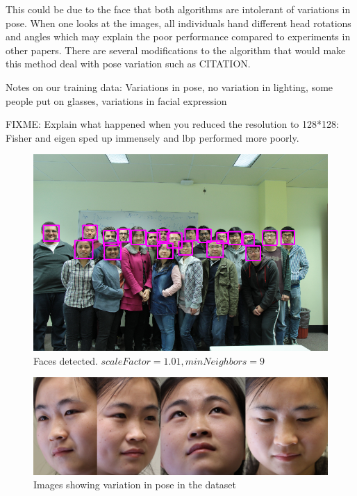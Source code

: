 \documentclass{article}
\begin{document}
This could be due to the face that both algorithms are intolerant of variations in pose. When one looks at the images, all individuals hand different head rotations and angles which may explain the poor performance compared to experiments in other papers\cite{belhumeur1997eigenfaces}. There are several modifications to the algorithm that would make this method deal with pose variation such as CITATION.

Notes on our training data: Variations in pose, no variation in lighting, some people put on glasses, variations in facial expression

FIXME: Explain what happened when you reduced the resolution to 128*128: Fisher and eigen sped up immensely and lbp performed more poorly.





\pagebreak

\begin{figure}[H]
\centering
\includegraphics[width=0.7\linewidth]{./groupdetected}
\caption{Faces detected. $scaleFactor=1.01, minNeighbors=9$}
\label{fig:group}
\end{figure}

\begin{figure}[H]
\centering
\includegraphics[width=0.7\linewidth]{./pose}
\caption{Images showing variation in pose in the dataset}
\label{fig:pose}
\end{figure} %
\end{document}
